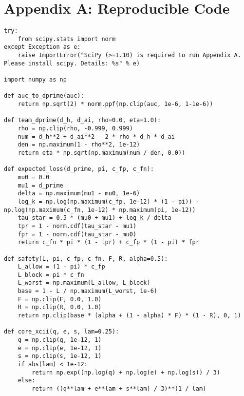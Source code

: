 \documentclass[11pt,a4paper]{article}
\begin{document}
\section{Appendix A: Reproducible Code}
\begin{lstlisting}
try:
    from scipy.stats import norm
except Exception as e:
    raise ImportError("SciPy (>=1.10) is required to run Appendix A. Please install scipy. Details: %s" % e)

import numpy as np

def auc_to_dprime(auc):
    return np.sqrt(2) * norm.ppf(np.clip(auc, 1e-6, 1-1e-6))

def team_dprime(d_h, d_ai, rho=0.0, eta=1.0):
    rho = np.clip(rho, -0.999, 0.999)
    num = d_h**2 + d_ai**2 - 2 * rho * d_h * d_ai
    den = np.maximum(1 - rho**2, 1e-12)
    return eta * np.sqrt(np.maximum(num / den, 0.0))

def expected_loss(d_prime, pi, c_fp, c_fn):
    mu0 = 0.0
    mu1 = d_prime
    delta = np.maximum(mu1 - mu0, 1e-6)
    log_k = np.log(np.maximum(c_fp, 1e-12) * (1 - pi)) - np.log(np.maximum(c_fn, 1e-12) * np.maximum(pi, 1e-12))
    tau_star = 0.5 * (mu0 + mu1) + log_k / delta
    tpr = 1 - norm.cdf(tau_star - mu1)
    fpr = 1 - norm.cdf(tau_star - mu0)
    return c_fn * pi * (1 - tpr) + c_fp * (1 - pi) * fpr

def safety(L, pi, c_fp, c_fn, F, R, alpha=0.5):
    L_allow = (1 - pi) * c_fp
    L_block = pi * c_fn
    L_worst = np.maximum(L_allow, L_block)
    base = 1 - L / np.maximum(L_worst, 1e-6)
    F = np.clip(F, 0.0, 1.0)
    R = np.clip(R, 0.0, 1.0)
    return np.clip(base * (alpha + (1 - alpha) * F) * (1 - R), 0, 1)

def core_xcii(q, e, s, lam=0.25):
    q = np.clip(q, 1e-12, 1)
    e = np.clip(e, 1e-12, 1)
    s = np.clip(s, 1e-12, 1)
    if abs(lam) < 1e-12:
        return np.exp((np.log(q) + np.log(e) + np.log(s)) / 3)
    else:
        return ((q**lam + e**lam + s**lam) / 3)**(1 / lam)


\end{lstlisting}
\end{document}
